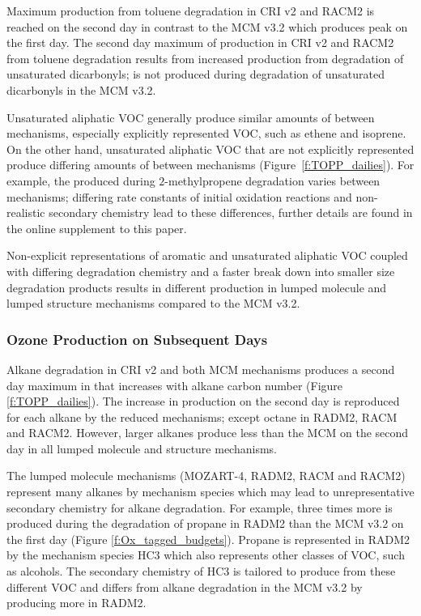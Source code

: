 Maximum  production from toluene degradation in CRI v2 and RACM2 is reached on the second day in contrast to the MCM v3.2 which produces peak  on the first day.
The second day maximum of  production in CRI v2 and RACM2 from toluene degradation results from increased  production from degradation of unsaturated dicarbonyls;  is not produced during degradation of unsaturated dicarbonyls in the MCM v3.2.

Unsaturated aliphatic VOC generally produce similar amounts of  between mechanisms, especially explicitly represented VOC, such as ethene and isoprene.
On the other hand, unsaturated aliphatic VOC that are not explicitly represented produce differing amounts of  between mechanisms \mbox{(Figure \ref{f:TOPP_dailies}).}
For example, the  produced during $2$-methylpropene degradation varies between mechanisms; differing rate constants of initial oxidation reactions and non-realistic secondary chemistry lead to these differences, further details are found in the online supplement to this paper.

Non-explicit representations of aromatic and unsaturated aliphatic VOC coupled with differing degradation chemistry and a faster break down into smaller size degradation products results in different  production in lumped molecule and lumped structure mechanisms compared to the MCM v3.2.
%
\subsubsection{Ozone Production on Subsequent Days} \label{sss:profiles} %
%
Alkane degradation in CRI v2 and both MCM mechanisms produces a second day maximum in  that increases with alkane carbon number (Figure \ref{f:TOPP_dailies}).
The increase in  production on the second day is reproduced for each alkane by the reduced mechanisms; except octane in RADM2, RACM and RACM2.
However, larger alkanes produce less  than the MCM on the second day in all lumped molecule and structure mechanisms.

The lumped molecule mechanisms (MOZART-4, RADM2, RACM and RACM2) represent many alkanes by mechanism species which may lead to unrepresentative secondary chemistry for alkane degradation.
For example, three times more  is produced during the degradation of propane in RADM2 than the MCM v3.2 on the first day (Figure \ref{f:Ox_tagged_budgets}).
Propane is represented in RADM2 by the mechanism species HC3 which also represents other classes of VOC, such as alcohols.
The secondary chemistry of HC3 is tailored to produce  from these different VOC and differs from alkane degradation in the MCM v3.2 by producing more  in RADM2.

